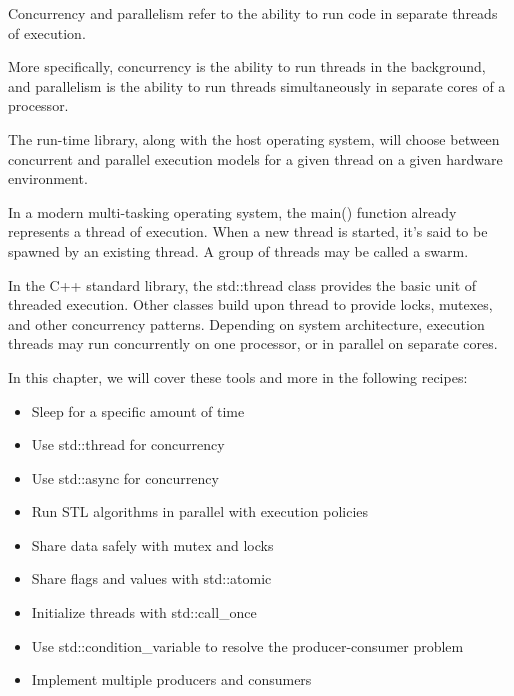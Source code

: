 Concurrency and parallelism refer to the ability to run code in separate threads of execution.

More specifically, concurrency is the ability to run threads in the background, and parallelism is the ability to run threads simultaneously in separate cores of a processor.

The run-time library, along with the host operating system, will choose between concurrent and parallel execution models for a given thread on a given hardware environment.

In a modern multi-tasking operating system, the main() function already represents a thread of execution. When a new thread is started, it's said to be spawned by an existing thread. A group of threads may be called a swarm.

In the C++ standard library, the std::thread class provides the basic unit of threaded execution. Other classes build upon thread to provide locks, mutexes, and other concurrency patterns. Depending on system architecture, execution threads may run concurrently on one processor, or in parallel on separate cores.


In this chapter, we will cover these tools and more in the following recipes:

\begin{itemize}
\item 
Sleep for a specific amount of time

\item 
Use std::thread for concurrency

\item 
Use std::async for concurrency

\item 
Run STL algorithms in parallel with execution policies

\item 
Share data safely with mutex and locks

\item 
Share flags and values with std::atomic

\item 
Initialize threads with std::call\_once

\item 
Use std::condition\_variable to resolve the producer-consumer problem

\item 
Implement multiple producers and consumers
\end{itemize}